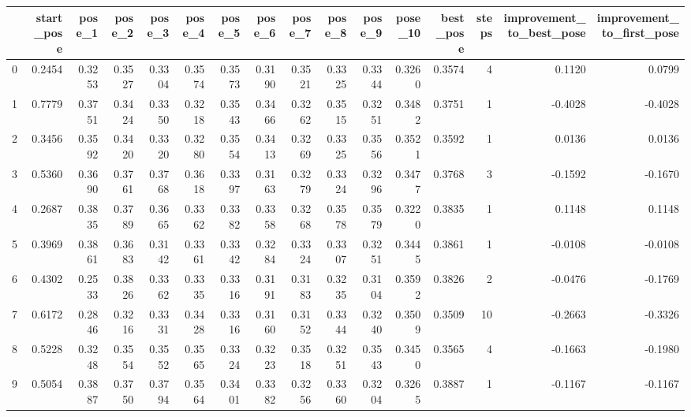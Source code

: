 \begin{tabular}{lrrrrrrrrrrrrrrr}
\toprule
{} &  start\_pose &  pose\_1 &  pose\_2 &  pose\_3 &  pose\_4 &  pose\_5 &  pose\_6 &  pose\_7 &  pose\_8 &  pose\_9 &  pose\_10 &  best\_pose &  steps &  improvement\_to\_best\_pose &  improvement\_to\_first\_pose \\
\midrule
0   &      0.2454 &  0.3253 &  0.3527 &  0.3304 &  0.3574 &  0.3573 &  0.3190 &  0.3521 &  0.3325 &  0.3344 &   0.3260 &     0.3574 &      4 &                    0.1120 &                     0.0799 \\
1   &      0.7779 &  0.3751 &  0.3424 &  0.3350 &  0.3218 &  0.3543 &  0.3466 &  0.3262 &  0.3515 &  0.3251 &   0.3482 &     0.3751 &      1 &                   -0.4028 &                    -0.4028 \\
2   &      0.3456 &  0.3592 &  0.3420 &  0.3320 &  0.3280 &  0.3554 &  0.3413 &  0.3269 &  0.3325 &  0.3556 &   0.3521 &     0.3592 &      1 &                    0.0136 &                     0.0136 \\
3   &      0.5360 &  0.3690 &  0.3761 &  0.3768 &  0.3618 &  0.3397 &  0.3163 &  0.3279 &  0.3324 &  0.3296 &   0.3477 &     0.3768 &      3 &                   -0.1592 &                    -0.1670 \\
4   &      0.2687 &  0.3835 &  0.3789 &  0.3665 &  0.3362 &  0.3382 &  0.3358 &  0.3268 &  0.3578 &  0.3579 &   0.3220 &     0.3835 &      1 &                    0.1148 &                     0.1148 \\
5   &      0.3969 &  0.3861 &  0.3683 &  0.3142 &  0.3361 &  0.3342 &  0.3284 &  0.3324 &  0.3307 &  0.3251 &   0.3445 &     0.3861 &      1 &                   -0.0108 &                    -0.0108 \\
6   &      0.4302 &  0.2533 &  0.3826 &  0.3362 &  0.3335 &  0.3316 &  0.3191 &  0.3183 &  0.3235 &  0.3104 &   0.3592 &     0.3826 &      2 &                   -0.0476 &                    -0.1769 \\
7   &      0.6172 &  0.2846 &  0.3216 &  0.3331 &  0.3428 &  0.3316 &  0.3160 &  0.3152 &  0.3344 &  0.3240 &   0.3509 &     0.3509 &     10 &                   -0.2663 &                    -0.3326 \\
8   &      0.5228 &  0.3248 &  0.3554 &  0.3552 &  0.3565 &  0.3324 &  0.3223 &  0.3518 &  0.3251 &  0.3543 &   0.3450 &     0.3565 &      4 &                   -0.1663 &                    -0.1980 \\
9   &      0.5054 &  0.3887 &  0.3750 &  0.3794 &  0.3564 &  0.3401 &  0.3382 &  0.3256 &  0.3360 &  0.3204 &   0.3265 &     0.3887 &      1 &                   -0.1167 &                    -0.1167 \\

\end{tabular}
